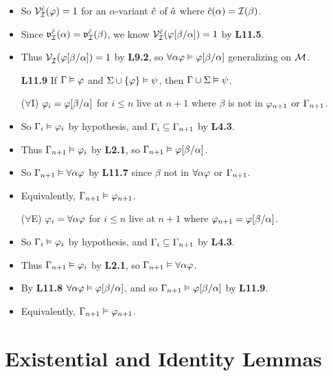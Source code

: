 \documentclass[a4paper, 11pt]{article} %
\begin{document}
\begin{itemize}
    \item So $\mathcal{V}_{\mathcal{I}}^{\hat{c}}(\varphi)=1$ for an $\alpha$-variant $\hat{c}$ of $\hat{a}$ where $\hat{c}(\alpha)=\mathcal{I}(\beta)$.
    \item Since $\mathfrak{v}_{\mathcal{I}}^{\hat{c}}(\alpha)=\mathfrak{v}_{\mathcal{I}}^{\hat{c}}(\beta)$, we know $\mathcal{V}_{\mathcal{I}}^{\hat{c}}(\varphi[\beta/\alpha])=1$ by \textbf{L11.5}.
    \item Thus $\mathcal{V}_{\mathcal{I}}^{}(\varphi[\beta/\alpha])=1$ by \textbf{L9.2}, so $\forall\alpha\varphi \vDash \varphi[\beta/\alpha]$ generalizing on $\mathcal{M}$.
  \item[\bf L11.9] If $\Gamma \vDash \varphi$ and $\Sigma \cup \lbrace\varphi\rbrace \vDash \psi$, then $\Gamma\cup\Sigma \vDash \psi$.
  \item[($\forall$I)] $\varphi_i=\varphi[\beta/\alpha]$ for $i\leq n$ live at $n+1$ where $\beta$ is not in $\varphi_{n+1}$ or $\Gamma_{n+1}$.
    \item So $\Gamma_i\vDash\varphi_i$ by hypothesis, and $\Gamma_i\subseteq\Gamma_{n+1}$ by \textbf{L4.3}.
    \item Thus $\Gamma_{n+1}\vDash\varphi_i$ by \textbf{L2.1}, so $\Gamma_{n+1}\vDash\varphi[\beta/\alpha]$.
    \item So $\Gamma_{n+1}\vDash \forall \alpha\varphi$ by \textbf{L11.7} since $\beta$ not in $\forall \alpha\varphi$ or $\Gamma_{n+1}$.
    \item Equivalently, $\Gamma_{n+1}\vDash \varphi_{n+1}$.
  \item[($\forall$E)] $\varphi_i=\forall \alpha\varphi$ for $i\leq n$ live at $n+1$ where $\varphi_{n+1}=\varphi[\beta/\alpha]$.
    \item So $\Gamma_i\vDash\varphi_i$ by hypothesis, and $\Gamma_i\subseteq\Gamma_{n+1}$ by \textbf{L4.3}.
    \item Thus $\Gamma_{n+1}\vDash\varphi_i$ by \textbf{L2.1}, so $\Gamma_{n+1}\vDash \forall \alpha\varphi$.
    \item By \textbf{L11.8} $\forall \alpha\varphi\vDash\varphi[\beta/\alpha]$, and so $\Gamma_{n+1}\vDash\varphi[\beta/\alpha]$ by \textbf{L11.9}.
    \item Equivalently, $\Gamma_{n+1}\vDash \varphi_{n+1}$.
\end{itemize}




\section*{Existential and Identity Lemmas}
\end{document}

